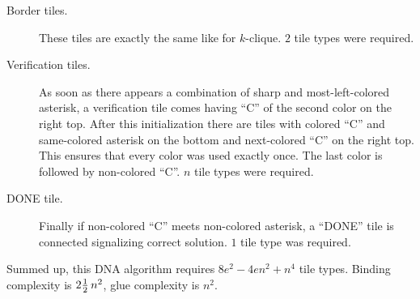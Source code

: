 \begin{description}
\begin{description}
	\end{description}
	\item[Border tiles.] These tiles are exactly the same like for $k$-clique. $2$ tile types were required.
	\item[Verification tiles.] As soon as there appears a combination of sharp and most-left-colored asterisk, a verification tile comes having ``C'' of the second color on the right top. After this initialization there are tiles with colored ``C'' and same-colored asterisk on the bottom and next-colored ``C'' on the right top. This ensures that every color was used exactly once. The last color is followed by non-colored ``C''. $n$ tile types were required.
	\item[DONE tile.] Finally if non-colored ``C'' meets non-colored asterisk, a ``DONE'' tile is connected signalizing correct solution. $1$ tile type was required.
\end{description}

Summed up, this DNA algorithm requires $8e^2 - 4en^2 + n^4$ tile types. Binding complexity is $2\nicefrac{1}{2}\,n^2$, glue complexity is $n^2$.

